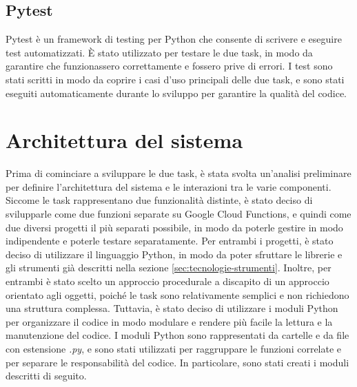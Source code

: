 \subsection{Pytest}
Pytest è un framework di testing per Python che consente di scrivere e eseguire test automatizzati. È stato utilizzato per testare le due task, in modo da garantire che funzionassero correttamente e fossero prive di errori. I test sono stati scritti in modo da coprire i casi d'uso principali delle due task, e sono stati eseguiti automaticamente durante lo sviluppo per garantire la qualità del codice.


\section{Architettura del sistema}

Prima di cominciare a sviluppare le due task, è stata svolta un'analisi preliminare per definire l'architettura del sistema e le interazioni tra le varie componenti. Siccome le task rappresentano due funzionalità distinte, è stato deciso di svilupparle come due funzioni separate su Google Cloud Functions, e quindi come due diversi progetti il più separati possibile, in modo da poterle gestire in modo indipendente e poterle testare separatamente.
Per entrambi i progetti, è stato deciso di utilizzare il linguaggio Python, in modo da poter sfruttare le librerie e gli strumenti già descritti nella sezione \ref{sec:tecnologie-strumenti}.
Inoltre, per entrambi è stato scelto un approccio procedurale a discapito di un approccio orientato agli oggetti, poiché le task sono relativamente semplici e non richiedono una struttura complessa. Tuttavia, è stato deciso di utilizzare i moduli Python per organizzare il codice in modo modulare e rendere più facile la lettura e la manutenzione del codice.
I moduli Python sono rappresentati da cartelle e da file con estensione \emph{.py}, e sono stati utilizzati per raggruppare le funzioni correlate e per separare le responsabilità del codice. In particolare, sono stati creati i moduli descritti di seguito.

